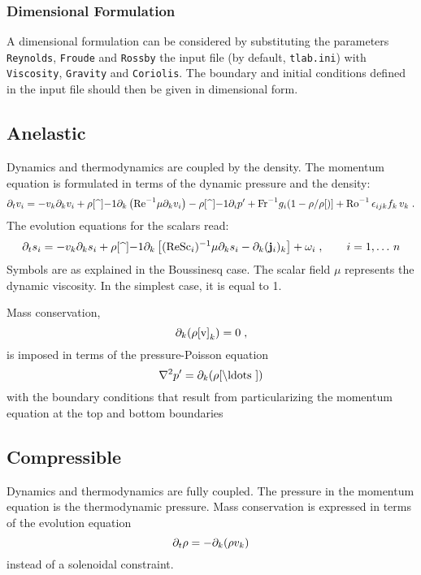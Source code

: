 \subsubsection{Dimensional Formulation}

A dimensional formulation can be considered by substituting the parameters \texttt{Reynolds}, \texttt{Froude} and \texttt{Rossby} the input file (by default, \texttt{tlab.ini}) with \texttt{Viscosity}, \texttt{Gravity} and \texttt{Coriolis}. The boundary and initial conditions defined in the input file should then be given in dimensional form. 

\subsection{Anelastic}

Dynamics and thermodynamics are coupled by the density. The momentum equation is formulated in terms of the dynamic pressure and the density:
\begin{equation}
    \pt v_i = -v_k\pk v_i + \rho\ref^{-1}\pk\left(\Re^{-1} \mu \pk v_i\right) -\rho\ref^{-1}\psi p'
        +\Fr^{-1} g_i(1-\rho/\rho\ref)+\Ro^{-1}\,\epsilon_{ijk} f_k\,v_k\;.
\end{equation}
The evolution equations for the scalars read:
\begin{equation}
    \pt s_i  = -v_k\pk s_i +\rho\ref^{-1}\pk \left[(\Re\Sc_i)^{-1} \mu \pk s_i -\pk (\j_i)_k\right] + \omega_i \;, \qquad i = 1,\ldots\,n
\end{equation}
Symbols are as explained in the Boussinesq case. The scalar field $\mu$ represents the dynamic viscosity. In the simplest case, it is equal to 1.
\par
Mass conservation,
\begin{equation}
    \pk (\rho\ref v_k)=0\;,
\end{equation}
is imposed in terms of the pressure-Poisson equation
\begin{equation}
    \nabla^2 p'=\pk(\rho\ref \ldots)
\end{equation}
with the boundary conditions that result from particularizing the momentum equation at the top and bottom boundaries

\subsection{Compressible}

Dynamics and thermodynamics are fully coupled. The pressure in the momentum equation is the thermodynamic pressure. Mass conservation is expressed in terms of the evolution equation
\begin{equation}
    \partial_t \rho = -\partial_k(\rho v_k) 
\end{equation}
instead of a solenoidal constraint.

